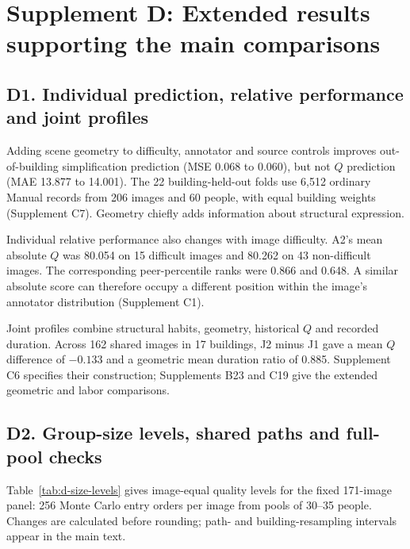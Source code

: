 \section*{Supplement D: Extended results supporting the main comparisons}

\subsection*{D1. Individual prediction, relative performance and joint profiles}
\label{supp:d1-individual}

Adding scene geometry to difficulty, annotator and source controls improves out-of-building simplification prediction (MSE 0.068 to 0.060), but not $Q$ prediction (MAE 13.877 to 14.001). The 22 building-held-out folds use 6,512 ordinary Manual records from 206 images and 60 people, with equal building weights (Supplement C7). Geometry chiefly adds information about structural expression.

Individual relative performance also changes with image difficulty. A2's mean absolute $Q$ was 80.054 on 15 difficult images and 80.262 on 43 non-difficult images. The corresponding peer-percentile ranks were 0.866 and 0.648. A similar absolute score can therefore occupy a different position within the image's annotator distribution (Supplement C1).

Joint profiles combine structural habits, geometry, historical $Q$ and recorded duration. Across 162 shared images in 17 buildings, J2 minus J1 gave a mean $Q$ difference of $-0.133$ and a geometric mean duration ratio of 0.885. Supplement C6 specifies their construction; Supplements B23 and C19 give the extended geometric and labor comparisons.

\subsection*{D2. Group-size levels, shared paths and full-pool checks}
\label{supp:d2-size}

Table~\ref{tab:d-size-levels} gives image-equal quality levels for the fixed 171-image panel: 256 Monte Carlo entry orders per image from pools of 30--35 people. Changes are calculated before rounding; path- and building-resampling intervals appear in the main text.

